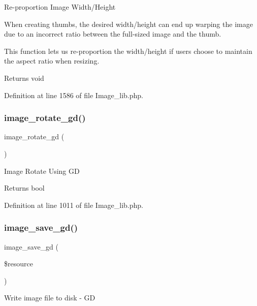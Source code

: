 Re-\/proportion Image Width/\+Height

When creating thumbs, the desired width/height can end up warping the image due to an incorrect ratio between the full-\/sized image and the thumb.

This function lets us re-\/proportion the width/height if users choose to maintain the aspect ratio when resizing.

\begin{DoxyReturn}{Returns}
void 
\end{DoxyReturn}


Definition at line 1586 of file Image\+\_\+lib.\+php.

\mbox{\label{class_c_i___image__lib_ae0d52ef7503342a0a1c56c99da140446}} 
\subsubsection{\texorpdfstring{image\_rotate\_gd()}{image\_rotate\_gd()}}
{\footnotesize\ttfamily image\+\_\+rotate\+\_\+gd (\begin{DoxyParamCaption}{ }\end{DoxyParamCaption})}

Image Rotate Using GD

\begin{DoxyReturn}{Returns}
bool 
\end{DoxyReturn}


Definition at line 1011 of file Image\+\_\+lib.\+php.

\mbox{\label{class_c_i___image__lib_a802a33d51249d4d31d59cbc89fbc4dd5}} 
\subsubsection{\texorpdfstring{image\_save\_gd()}{image\_save\_gd()}}
{\footnotesize\ttfamily image\+\_\+save\+\_\+gd (\begin{DoxyParamCaption}\item[{}]{\$resource }\end{DoxyParamCaption})}

Write image file to disk -\/ GD

